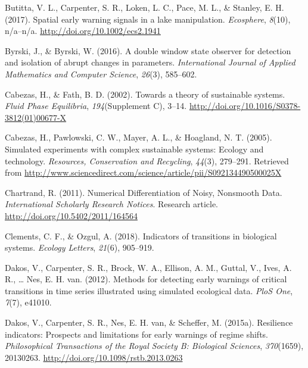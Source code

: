 \documentclass[12pt,twoside,openany]{reedthesis}
\begin{document}
\leavevmode\hypertarget{ref-butitta_spatial_2017}{}%
Butitta, V. L., Carpenter, S. R., Loken, L. C., Pace, M. L., \& Stanley, E. H. (2017). Spatial early warning signals in a lake manipulation. \emph{Ecosphere}, \emph{8}(10), n/a--n/a. \url{http://doi.org/10.1002/ecs2.1941}

\leavevmode\hypertarget{ref-byrski2016double}{}%
Byrski, J., \& Byrski, W. (2016). A double window state observer for detection and isolation of abrupt changes in parameters. \emph{International Journal of Applied Mathematics and Computer Science}, \emph{26}(3), 585--602.

\leavevmode\hypertarget{ref-cabezas_towards_2002}{}%
Cabezas, H., \& Fath, B. D. (2002). Towards a theory of sustainable systems. \emph{Fluid Phase Equilibria}, \emph{194}(Supplement C), 3--14. \url{http://doi.org/10.1016/S0378-3812(01)00677-X}

\leavevmode\hypertarget{ref-cabezas_simulated_2005}{}%
Cabezas, H., Pawlowski, C. W., Mayer, A. L., \& Hoagland, N. T. (2005). Simulated experiments with complex sustainable systems: Ecology and technology. \emph{Resources, Conservation and Recycling}, \emph{44}(3), 279--291. Retrieved from \url{http://www.sciencedirect.com/science/article/pii/S092134490500025X}

\leavevmode\hypertarget{ref-chartrand_numerical_2011}{}%
Chartrand, R. (2011). Numerical Differentiation of Noisy, Nonsmooth Data. \emph{International Scholarly Research Notices}. Research article. \url{http://doi.org/10.5402/2011/164564}

\leavevmode\hypertarget{ref-clements2018indicators}{}%
Clements, C. F., \& Ozgul, A. (2018). Indicators of transitions in biological systems. \emph{Ecology Letters}, \emph{21}(6), 905--919.

\leavevmode\hypertarget{ref-dakos_methods_2012}{}%
Dakos, V., Carpenter, S. R., Brock, W. A., Ellison, A. M., Guttal, V., Ives, A. R., \ldots{} Nes, E. H. van. (2012). Methods for detecting early warnings of critical transitions in time series illustrated using simulated ecological data. \emph{PloS One}, \emph{7}(7), e41010.

\leavevmode\hypertarget{ref-dakos_resilience_2015}{}%
Dakos, V., Carpenter, S. R., Nes, E. H. van, \& Scheffer, M. (2015a). Resilience indicators: Prospects and limitations for early warnings of regime shifts. \emph{Philosophical Transactions of the Royal Society B: Biological Sciences}, \emph{370}(1659), 20130263. \url{http://doi.org/10.1098/rstb.2013.0263}
\end{document}

